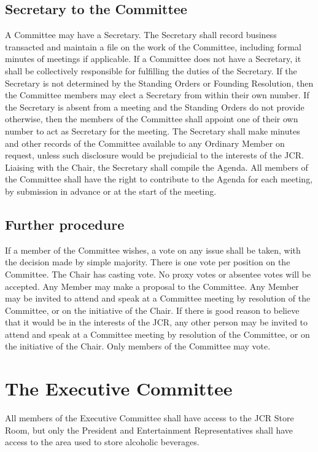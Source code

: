 \subsection{Secretary to the Committee}
\npara A Committee may have a Secretary. The Secretary shall record business transacted and maintain a file on the work of the Committee, including formal minutes of meetings if applicable. If a Committee does not have a Secretary, it shall be collectively responsible for fulfilling the duties of the Secretary.
\npara If the Secretary is not determined by the Standing Orders or Founding Resolution, then the Committee members may elect a Secretary from within their own number.
\npara If the Secretary is absent from a meeting and the Standing Orders do not provide otherwise, then the members of the Committee shall appoint one of their own number to act as Secretary for the meeting.
\npara The Secretary shall make minutes and other records of the Committee available to any Ordinary Member on request, unless such disclosure would be prejudicial to the interests of the JCR.
\npara Liaising with the Chair, the Secretary shall compile the Agenda.
All members of the Committee shall have the right to contribute to the Agenda for each meeting, by submission in advance or at the start of the meeting.
\subsection{Further procedure}
\npara If a member of the Committee wishes, a vote on any issue shall be taken, with the decision made by simple majority.
There is one vote per position on the Committee.
The Chair has casting vote. No proxy votes or absentee votes will be accepted.
\npara Any Member may make a proposal to the Committee.
\npara Any Member may be invited to attend and speak at a Committee meeting by resolution of the Committee, or on the initiative of the Chair.  If there is good reason to believe that it would be in the interests of the JCR, any other person may be invited to attend and speak at a Committee meeting by resolution of the Committee, or on the initiative of the Chair.
Only members of the Committee may vote.
\section{The Executive Committee} \label{com:exec}
\npara All members of the Executive Committee shall have access to the JCR Store Room, but only the President and Entertainment Representatives shall have access to the area used to store alcoholic beverages.
